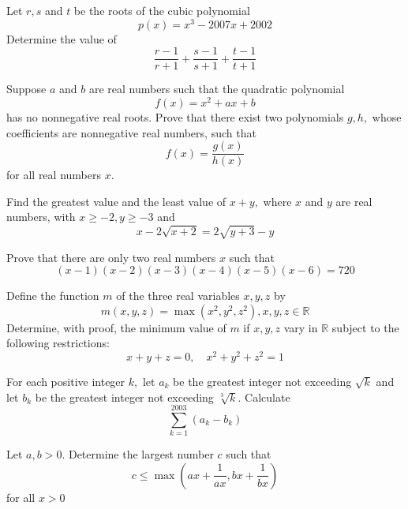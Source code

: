 \documentclass{pset}
\begin{document}
\begin{problems}
\begin{problem}[IrMO 2007 Q6]
    Let \(r, s\) and \(t\) be the roots of the cubic polynomial
    $$
    p(x)=x^{3}-2007 x+2002
    $$
    Determine the value of
    $$
    \frac{r-1}{r+1}+\frac{s-1}{s+1}+\frac{t-1}{t+1}
    $$
\end{problem}

\begin{problem}[IrMO 2007 Q10]
    Suppose \(a\) and \(b\) are real numbers such that the quadratic polynomial
    $$
    f(x)=x^{2}+a x+b
    $$
    has no nonnegative real roots. Prove that there exist two polynomials \(g, h,\) whose coefficients are nonnegative real numbers, such that
    $$
    f(x)=\frac{g(x)}{h(x)}
    $$
    for all real numbers \(x\).
\end{problem}

\begin{problem}[IrMO 2006 Q4]
    Find the greatest value and the least value of \(x+y,\) where \(x\) and \(y\) are real numbers, with \(x \geq-2, y \geq-3\) and
    $$
    x-2 \sqrt{x+2}=2 \sqrt{y+3}-y
    $$
\end{problem}

\begin{problem}[IrMO 2004 Q4]
    Prove that there are only two real numbers \(x\) such that
    $$
    (x-1)(x-2)(x-3)(x-4)(x-5)(x-6)=720
    $$
\end{problem}

\begin{problem}[IrMO 2004 Q4]
    Define the function \(m\) of the three real variables \(x, y, z\) by
    $$
    m(x, y, z)=\max \left(x^{2}, y^{2}, z^{2}\right), x, y, z \in \mathbb{R}
    $$
    Determine, with proof, the minimum value of \(m\) if \(x, y, z\) vary in \(\mathbb{R}\) subject to the following restrictions:
    $$
    x+y+z=0, \quad x^{2}+y^{2}+z^{2}=1
    $$
\end{problem}

\begin{problem}[IrMO 2003 Q3]
    For each positive integer \(k,\) let \(a_{k}\) be the greatest integer not exceeding \(\sqrt{k}\) and let \(b_{k}\) be the greatest integer not exceeding \(\sqrt[3]{k} .\) Calculate
    $$
    \sum_{k=1}^{2003}\left(a_{k}-b_{k}\right)
    $$
\end{problem}

\begin{problem}[IrMO 2003 Q9]
    Let \(a, b>0 .\) Determine the largest number \(c\) such that
    $$
    c \leq \max \left(a x+\frac{1}{a x}, b x+\frac{1}{b x}\right)
    $$
    for all \(x>0\)
\end{problem}


\end{problems}
\end{document}
